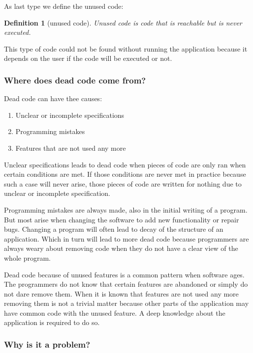 \documentclass[a4paper,10pt,twocolumn]{article}
\newtheorem*{definition}{Definition}
\begin{document}
As last type we define the unused code:

\begin{definition}[unused code]
Unused code is code that is reachable but is never executed. 
\end{definition}
This type of code could not be found without running the application because it depends on the user if the code will be executed or not.


\subsubsection*{Where does dead code come from?}

Dead code can have thee causes:

\begin{enumerate}
\item Unclear or incomplete specifications
\item Programming mistakes
\item Features that are not used any more
\end{enumerate}

Unclear specifications leads to dead code when pieces of code are only ran when certain conditions are met. If those conditions are never met in practice because such a case will never arise, those pieces of code are written for nothing due to unclear or incomplete specification.

Programming mistakes are always made, also in the initial writing of a program. But most arise when changing the software to add new functionality or repair bugs. Changing a program will often lead to decay of the structure of an application\cite{parnas1994}. Which in turn will lead to more dead code because programmers are always weary about removing code when they do not have a clear view of the whole program.

Dead code because of unused features is a common pattern when software ages. The programmers do not know that certain features are abandoned or simply do not dare remove them\cite{parnas1994}. When it is known that features are not used any more removing them is not a trivial matter because other parts of the application may have common code with the unused feature. A deep knowledge about the application is required to do so.

\subsubsection*{Why is it a problem?}
\end{document}
